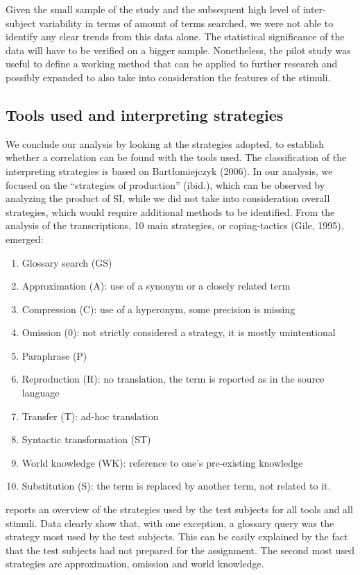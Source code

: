 \documentclass[output=paper]{langsci/langscibook}
\begin{document}
Given the small sample of the study and the subsequent high level of inter-subject variability in terms of amount of terms searched, we were not able to identify any clear trends from this data alone. The statistical significance of the data will have to be verified on a bigger sample. Nonetheless, the pilot study was useful to define a working method that can be applied to further research and possibly expanded to also take into consideration the features of the stimuli. 

\subsection{Tools used and interpreting strategies}\label{sec:prandi:5.3}
We conclude our analysis by looking at the strategies adopted, to establish whether a correlation can be found with the tools used. The classification of the interpreting strategies is based on Bartłomiejczyk (2006). In our analysis, we focused on the ``strategies of production'' (ibid.), which can be observed by analyzing the product of \textsc{SI}, while we did not take into consideration overall strategies, which would require additional methods to be identified. From the analysis of the transcriptions, 10 main strategies, or coping-tactics (Gile, 1995), emerged:

\begin{enumerate}
\item Glossary search (GS)
\item Approximation (A): use of a synonym or a closely related term
\item Compression (C): use of a hyperonym, some precision is missing
\item Omission (0): not strictly considered a strategy, it is mostly unintentional
\item Paraphrase (P)
\item Reproduction (R): no translation, the term is reported as in the source language
\item Transfer (T): ad-hoc translation
\item Syntactic transformation (ST)
\item World knowledge (WK): reference to one’s pre-existing knowledge
\item Substitution (S): the term is replaced by another term, not related to it.
\end{enumerate}


 reports an overview of the strategies used by the test subjects for all tools and all stimuli. Data clearly show that, with one exception, a glossary query was the strategy most used by the test subjects. This can be easily explained by the fact that the test subjects had not prepared for the assignment. The second most used strategies are approximation, omission and world knowledge.
\end{document}
